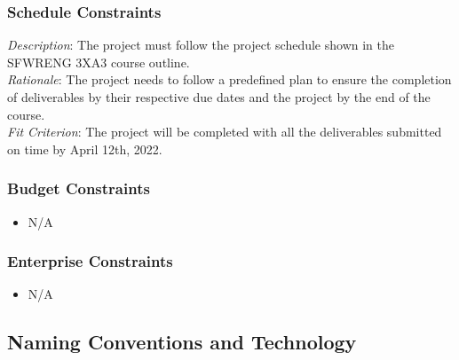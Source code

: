 \documentclass[12pt, titlepage]{article}
\begin{document}
\subsubsection{Schedule Constraints}

\emph{Description}: The project must follow the project schedule shown in the SFWRENG 3XA3 course outline.\\
\emph{Rationale}: The project needs to follow a predefined plan to ensure the completion of deliverables by their respective due dates and the project by the end of the course.\\
\emph{Fit Criterion}: The project will be completed with all the deliverables submitted on time by April 12th, 2022. 

\subsubsection{Budget Constraints}

\begin{itemize}
  \item[] N/A
\end{itemize}

\subsubsection{Enterprise Constraints}

\begin{itemize}
  \item[] N/A
\end{itemize}

\subsection{Naming Conventions and Technology}
\end{document}
